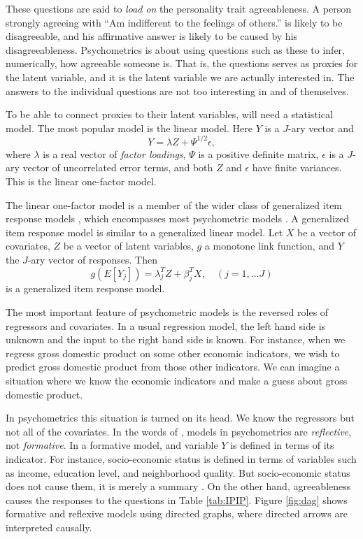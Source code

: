 These questions are said to \textit{load on} the personality trait agreeableness. A person strongly agreeing with ``Am indifferent to the feelings of others.'' is likely to be disagreeable, and his affirmative answer is likely to be caused by his disagreeableness. Psychometrics is about using questions such as these to infer, numerically, how agreeable someone is. That is, the questions serves as proxies for the latent variable, and it is the latent variable we are actually interested in. The answers to the individual questions are not too interesting in and of themselves.

To be able to connect proxies to their latent variables, will need a statistical model. The most popular model is the linear model. Here $Y$ is a $J$-ary vector and
\begin{equation}
Y=\lambda Z+\Psi^{1/2}\epsilon,\label{eq:one-factor model}
\end{equation}
where $\lambda$ is a real vector of \emph{factor loadings}, $\Psi$ is a positive definite matrix, $\epsilon$ is a $J$-ary vector of uncorrelated error terms, and both $Z$ and $\epsilon$ have finite variances. This is the linear one-factor model.

The linear one-factor model is a member of the wider class of generalized item response models \parencite{Mellenbergh1994-iy}, which encompasses most psychometric models \parencite[Chapter 3.1]{Borsboom2005-iq}. A generalized item response model is similar to a generalized linear model. Let $X$ be a vector of covariates, $Z$ be a vector of latent variables, $g$ a monotone link function, and $Y$ the $J$-ary vector of responses. Then 
\begin{equation}
g(E[Y_{j}])=\lambda_{j}^{T}Z+\beta_{j}^{T}X,\quad(j=1,\ldots J)\label{eq:GLIRT model}
\end{equation}
is a generalized item response model.

The most important feature of psychometric models is the reversed roles of regressors and covariates. In a usual regression model, the left hand side is unknown and the input to the right hand side is known. For instance, when we regress gross domestic product on some other economic indicators, we wish to predict gross domestic product from those other indicators. We can imagine a situation where we know the economic indicators and make a guess about gross domestic product. 

In psychometrics this situation is turned on its head. We know the regressors but not all of the covariates. In the words of \textcite[p. 61]{Borsboom2005-iq}, models in psychometrics are \emph{reflective}, not \emph{formative}. In a formative model, and variable $Y$ is defined in terms of its indicator. For instance, socio-economic status is defined in terms of variables such as income, education level, and neighborhood quality. But socio-economic status does not cause them, it is merely a summary \parencite[p. 62]{Borsboom2005-iq}. On the other hand, agreeableness causes the responses to the questions in Table \ref{tab:IPIP}. Figure \ref{fig:dag} shows formative and reflexive models using directed graphs, where directed arrows are interpreted causally.

